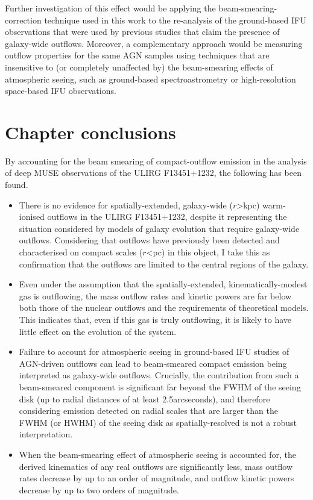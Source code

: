 Further investigation of this effect would be applying the beam-smearing-correction technique used in this work to the re-analysis of the ground-based IFU observations that were used by previous studies that claim the presence of galaxy-wide outflows. Moreover, a complementary approach would be measuring outflow properties for the same AGN samples using techniques that are insensitive to (or completely unaffected by) the beam-smearing effects of atmospheric seeing, such as ground-based spectroastrometry or high-resolution space-based IFU observations.

\section{Chapter conclusions}
\label{section: muse_f13451_1232: conclusions}

By accounting for the beam smearing of compact-outflow emission in the analysis of deep MUSE observations of the ULIRG F13451+1232, the following has been found.

\begin{itemize}
    \item There is no evidence for spatially-extended, galaxy-wide ($r$\;\textgreater{}\;kpc) warm-ionised outflows in the ULIRG F13451+1232, despite it representing the situation considered by models of galaxy evolution that require galaxy-wide outflows. Considering that outflows have previously been detected and characterised on compact scales ($r$\;\textless{}\;pc) in this object, I take this as confirmation that the outflows are limited to the central regions of the galaxy.
    \item Even under the assumption that the spatially-extended, kinematically-modest gas is outflowing, the mass outflow rates and kinetic powers are far below both those of the nuclear outflows and the requirements of theoretical models. This indicates that, even if this gas is truly outflowing, it is likely to have little effect on the evolution of the system.
    \item Failure to account for atmospheric seeing in ground-based IFU studies of AGN-driven outflows can lead to beam-smeared compact emission being interpreted as galaxy-wide outflows. Crucially, the contribution from such a beam-smeared component is significant far beyond the FWHM of the seeing disk (up to radial distances of at least 2.5\;arcseconds), and therefore considering emission detected on radial scales that are larger than the FWHM (or HWHM) of the seeing disk as spatially-resolved is not a robust interpretation.
    \item When the beam-smearing effect of atmospheric seeing is accounted for, the derived kinematics of any real outflows are significantly less, mass outflow rates decrease by up to an order of magnitude, and outflow kinetic powers decrease by up to two orders of magnitude.
\end{itemize}

